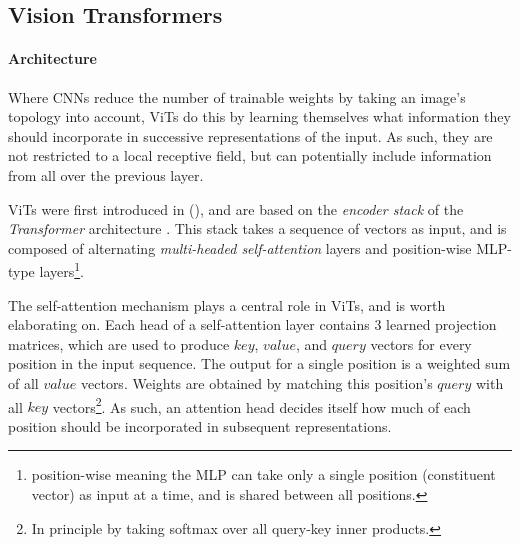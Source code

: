 

\subsection{Vision Transformers} \label{vits}
\paragraph{Architecture}
Where CNNs reduce the number of trainable weights by taking an image's topology into account, ViTs do this by learning themselves what information they should incorporate in successive representations of the input. As such, they are not restricted to a local receptive field, but can potentially include information from all over the previous layer.

ViTs were first introduced in \citeauthor{dosovitskiy2020image} (\citeyear{dosovitskiy2020image}), and are based on the \textit{encoder stack} of the \textit{Transformer} architecture \citep{vaswani2017attention}. This stack takes a sequence of vectors as input, and is composed of alternating \textit{multi-headed self-attention} layers and position-wise MLP-type layers\footnote{position-wise meaning the MLP can take only a single position (constituent vector) as input at a time, and is shared between all positions.}.

The self-attention mechanism plays a central role in ViTs, and is worth elaborating on. Each head of a self-attention layer contains 3 learned projection matrices, which are used to produce $key$, $value$, and $query$ vectors for every position in the input sequence. The output for a single position is a weighted sum of all $value$ vectors. Weights are obtained by matching this position's $query$ with all $key$ vectors\footnote{In principle by taking softmax over all query-key inner products.}. As such, an attention head decides itself how much of each position should be incorporated in subsequent representations.

